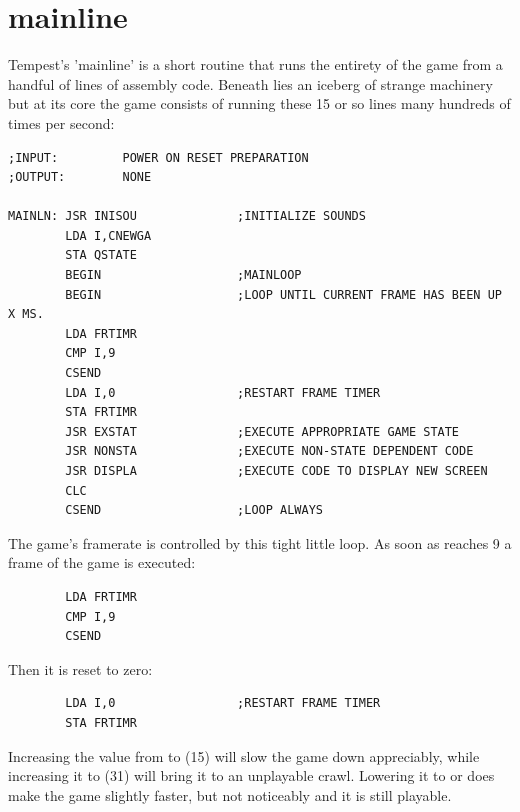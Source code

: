 \chapter{mainline}
\label{sec:listing}
\lstset{style=6502Style}

\lhead[tempest]{}
Tempest's 'mainline' is a short routine that runs the entirety of the game from a handful of lines
of assembly code. Beneath lies an iceberg of strange machinery but at its core the game consists of
running these 15 or so lines many hundreds of times per second:

\begin{lstlisting}
;INPUT:         POWER ON RESET PREPARATION
;OUTPUT:        NONE

MAINLN: JSR INISOU              ;INITIALIZE SOUNDS
        LDA I,CNEWGA
        STA QSTATE
        BEGIN                   ;MAINLOOP
        BEGIN                   ;LOOP UNTIL CURRENT FRAME HAS BEEN UP X MS.
        LDA FRTIMR
        CMP I,9
        CSEND
        LDA I,0                 ;RESTART FRAME TIMER
        STA FRTIMR
        JSR EXSTAT              ;EXECUTE APPROPRIATE GAME STATE
        JSR NONSTA              ;EXECUTE NON-STATE DEPENDENT CODE
        JSR DISPLA              ;EXECUTE CODE TO DISPLAY NEW SCREEN
        CLC
        CSEND                   ;LOOP ALWAYS
\end{lstlisting}

The game's framerate is controlled by this tight little loop. As soon as  reaches 9 a frame
of the game is executed:
\begin{lstlisting}
        LDA FRTIMR
        CMP I,9
        CSEND
\end{lstlisting}
Then it is reset to zero:
\begin{lstlisting}
        LDA I,0                 ;RESTART FRAME TIMER
        STA FRTIMR
\end{lstlisting}
Increasing the value from  to  (15) will slow the game down appreciably, while increasing
it to  (31) will bring it to an unplayable crawl. Lowering it to  or  does make the game slightly
faster, but not noticeably and it is still playable.

